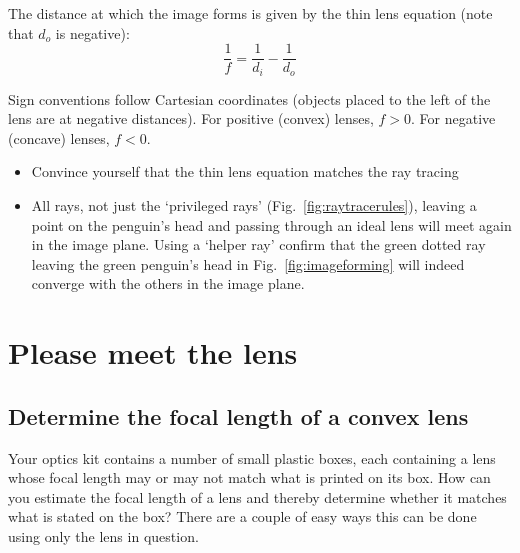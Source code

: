 \documentclass[a4paper]{report}
\begin{document}
	\noindent
	   The distance at which the image forms is given by the thin lens equation (note that $d_o$ is negative):
	\begin{equation}
	\frac{1}{f} = \frac{1}{d_i} - \frac{1}{d_o}
	\label{eq:thinlens}
	\end{equation}

	Sign conventions follow Cartesian coordinates (objects placed to the left of the lens are at negative distances). For positive (convex) lenses, $f>0$. For negative (concave) lenses, $f<0$.

	\begin{itemize}
	    \item Convince yourself that the thin lens equation matches the ray tracing
	    \item All rays, not just the `privileged rays' (Fig.~\ref{fig:raytracerules}), leaving a point on the penguin's head and passing through an ideal lens will meet again in the image plane. Using a `helper ray' confirm that the green dotted ray leaving the green penguin's head in Fig.~\ref{fig:imageforming} will indeed converge with the others in the image plane.
	\end{itemize}


    \clearpage

	\section{Please meet the lens}

    \subsection{Determine the focal length of a convex lens}
	\hypertarget{hintBack-focal_length}{}
	Your optics kit contains a number of small plastic boxes, each containing a lens whose focal length may or may not match what is printed on its box.
	How can you estimate the focal length of a lens and thereby determine whether it matches what is stated on the box?
    There are a couple of easy ways this can be done using only the lens in question.



\end{document}
